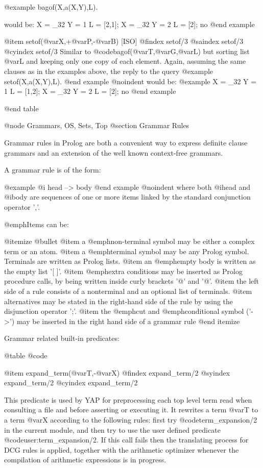 {{{{{@example
bagof(X,a(X,Y),L).

would be:
X = _32
Y = 1
L = [2,1];
X = _32
Y = 2
L = [2];
no
@end example

@item setof(@var{X},+@var{P},-@var{B}) [ISO]
@findex setof/3
@saindex setof/3
@cyindex setof/3
Similar to @code{bagof(@var{T},@var{G},@var{L})} but sorting list
@var{L} and keeping only one copy of each element.  Again, assuming the
same clauses as in the examples above, the reply to the query
@example
setof(X,a(X,Y),L).
@end example
@noindent
would be:
@example
X = _32
Y = 1
L = [1,2];
X = _32
Y = 2
L = [2];
no
@end example

@end table

@node Grammars, OS, Sets, Top
@section Grammar Rules

Grammar rules in Prolog are both a convenient way to express definite
clause grammars and  an extension of the well known context-free grammars.

A grammar rule is of the form:

@example
@i{ head --> body }
@end example
@noindent
where both @i{head} and @i{body} are sequences of one or more items
linked by the standard conjunction operator ','.

@emph{Items can be:}

@itemize @bullet
@item
a @emph{non-terminal} symbol may be either a complex term or an atom.
@item
a @emph{terminal} symbol may be any Prolog symbol. Terminals are
written as Prolog lists.
@item
an @emph{empty body} is written as the empty list '[ ]'.
@item
@emph{extra conditions} may be inserted as Prolog procedure calls, by being
written inside curly brackets '@{' and '@}'.
@item
the left side of a rule consists of a nonterminal and an optional list
of terminals.
@item
alternatives may be stated in the right-hand side of the rule by using
the disjunction operator ';'.
@item
the @emph{cut} and @emph{conditional} symbol ('->') may be inserted in the 
right hand side of a grammar rule
@end itemize

Grammar related built-in predicates:

@table @code

@item expand_term(@var{T},-@var{X})
@findex expand_term/2
@syindex expand_term/2
@cyindex expand_term/2

This predicate is used by YAP for preprocessing each top level
term read when consulting a file and before asserting or executing it.
It rewrites a term @var{T} to a term @var{X} according to the following
rules: first try @code{term_expansion/2}  in the current module, and then try to use the user defined predicate
@code{user:term_expansion/2}. If this call fails then the translating process
for DCG rules is applied, together with the arithmetic optimizer
whenever the compilation of arithmetic expressions is in progress.

}}}}}
